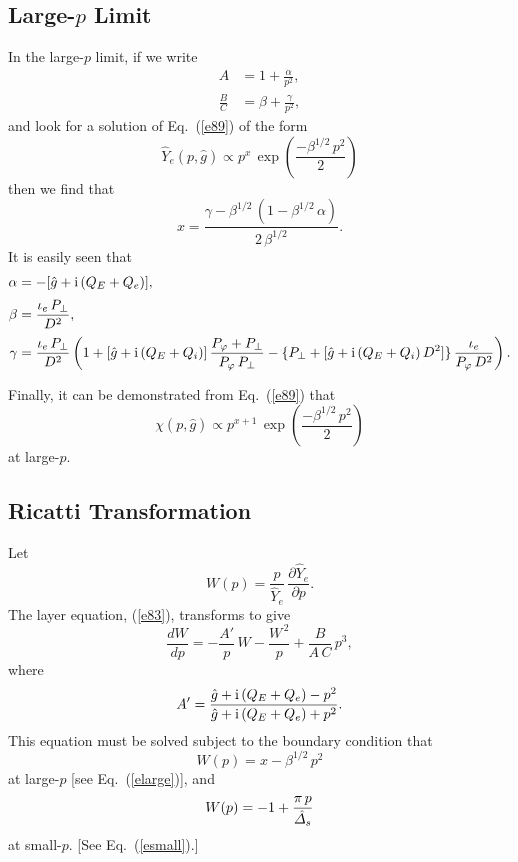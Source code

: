 \documentclass[12pt,prb,aps]{revtex4-1}
\begin{document}
\subsection{Large-$p$ Limit}
In the large-$p$ limit, if we write
\begin{align}
A &=1+\frac{\alpha}{p^2},\\[0.5ex]
\frac{B}{C} &= \beta+\frac{\gamma}{p^2},
\end{align}
and
look for a solution of Eq.~(\ref{e89}) of the form
\begin{equation}\label{elarge}
\hat{Y}_e(p,\hat{g}) \propto p^x\,\exp\left(\frac{-\beta^{1/2}\,p^2}{2}\right)
\end{equation}
then we find that
\begin{equation}
x = \frac{\gamma -\beta^{1/2}\,(1-\beta^{1/2}\,\alpha)}{2\,\beta^{1/2}}.
\end{equation}
It is easily seen that
\begin{align}
\alpha &= -[\hat{g}+ {\rm i}\,(Q_E+Q_e)],\\[0.5ex]
\beta&= \frac{\iota_e\,P_\perp}{D^2},\\[0.5ex]
\gamma&= \frac{\iota_e\,P_\perp}{D^2}\left(1+ [\hat{g}+{\rm i}\,(Q_E+Q_i)]\,\frac{P_\varphi+P_\perp}{P_\varphi\,P_\perp}
-\{P_\perp+[\hat{g}+{\rm i}\,(Q_E+Q_i)\,D^2]\}\,\frac{\iota_e}{P_\varphi\,D^2}\right).
\end{align}

Finally, it can be demonstrated from Eq.~(\ref{e89}) that
\begin{equation}\label{elargea}
\chi(p,\hat{g}) \propto p^{x+1}\,\exp\left(\frac{-\beta^{1/2}\,p^2}{2}\right)
\end{equation}
at large-$p$. 

\subsection{Ricatti Transformation}
Let 
\begin{equation}
W(p)= \frac{p}{\hat{Y}_e}\,\frac{\partial\hat{Y}_e}{\partial p}.
\end{equation}
The layer equation, (\ref{e83}), transforms to give
\begin{equation}\label{e72a}
\frac{dW}{dp} =- \frac{A'}{p}\,W -\frac{W^{\,2}}{p} + \frac{B}{A\,C}\,p^3,
\end{equation}
where
\begin{equation}
A' = \frac{\hat{g}+{\rm i}\,(Q_E+Q_e)-p^2}{\hat{g}+{\rm i}\,(Q_E+Q_e)+p^2}.
\end{equation}
This equation must be solved subject to the boundary condition that
\begin{equation}\label{e63a}
W(p) = x-\beta^{1/2}\,p^2
\end{equation}
at large-$p$ [see Eq.~(\ref{elarge})], and
\begin{equation}\label{e73ax}
W(p) =-1+\frac{\pi\,p}{\hat{\mit\Delta}_s}
\end{equation}
at small-$p$. [See Eq.~(\ref{esmall}).]
\end{document}
